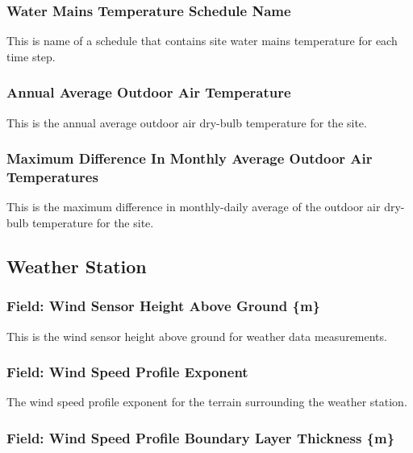 \subsubsection{Water Mains Temperature Schedule Name}\label{water-mains-temperature-schedule-name}

This is name of a schedule that contains site water mains temperature for each time step.

\subsubsection{Annual Average Outdoor Air Temperature}\label{annual-average-outdoor-air-temperature}

This is the annual average outdoor air dry-bulb temperature for the site.

\subsubsection{Maximum Difference In Monthly Average Outdoor Air Temperatures}\label{maximum-difference-in-monthly-average-outdoor-air-temperatures}

This is the maximum difference in monthly-daily average of the outdoor air dry-bulb temperature for the site.

\subsection{Weather Station}\label{weather-station}

\subsubsection{Field: Wind Sensor Height Above Ground \{m\}}\label{field-wind-sensor-height-above-ground-m}

This is the wind sensor height above ground for weather data measurements.

\subsubsection{Field: Wind Speed Profile Exponent}\label{field-wind-speed-profile-exponent}

The wind speed profile exponent for the terrain surrounding the weather station.

\subsubsection{Field: Wind Speed Profile Boundary Layer Thickness \{m\}}\label{field-wind-speed-profile-boundary-layer-thickness-m}

